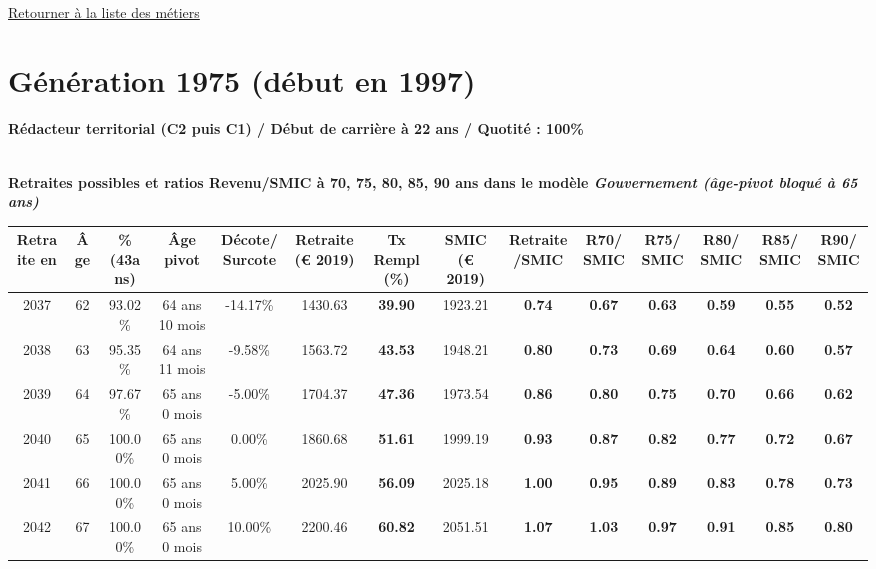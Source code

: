 ~\\ 
 
 \hyperlink{page.2}{\noindent Retourner à la liste des métiers}

 \newpage 

\section{Génération 1975 (début en 1997)\label{Redacteur_100_1975_22_0}} 
 
{\bf \noindent Rédacteur territorial (C2 puis C1) / Début de carrière à 22 ans / Quotité : 100\%}  ~ 

 ~\\{\bf \noindent Retraites possibles et ratios Revenu/SMIC à 70, 75, 80, 85, 90 ans dans le modèle \emph{Gouvernement (âge-pivot bloqué à 65 ans)}}  
 
\begin{adjustbox}{max width=\textwidth} 
\begin{tabular}[htb]{|c|c||c|c|c||c|c||c|c||c|c|c|c|c|} 
\hline 
 Retraite en &  Âge &  \%(43ans) &  Âge pivot &  Décote/Surcote &  Retraite (\euro{} 2019) &  Tx Rempl(\%) &  SMIC (\euro{} 2019) &  Retraite/SMIC &  R70/SMIC &  R75/SMIC &  R80/SMIC &  R85/SMIC &  R90/SMIC \\ 
\hline \hline 
 2037 &  62 &  93.02\% &  64 ans 10 mois &  -14.17\% &  1430.63 &  {\bf 39.90} &  1923.21 &  {\bf {\color{red} 0.74}} &  {\bf {\color{red} 0.67}} &  {\bf {\color{red} 0.63}} &  {\bf {\color{red} 0.59}} &  {\bf {\color{red} 0.55}} &  {\bf {\color{red} 0.52}} \\ 
\hline 
 2038 &  63 &  95.35\% &  64 ans 11 mois &  -9.58\% &  1563.72 &  {\bf 43.53} &  1948.21 &  {\bf {\color{red} 0.80}} &  {\bf {\color{red} 0.73}} &  {\bf {\color{red} 0.69}} &  {\bf {\color{red} 0.64}} &  {\bf {\color{red} 0.60}} &  {\bf {\color{red} 0.57}} \\ 
\hline 
 2039 &  64 &  97.67\% &  65 ans 0 mois &  -5.00\% &  1704.37 &  {\bf 47.36} &  1973.54 &  {\bf {\color{red} 0.86}} &  {\bf {\color{red} 0.80}} &  {\bf {\color{red} 0.75}} &  {\bf {\color{red} 0.70}} &  {\bf {\color{red} 0.66}} &  {\bf {\color{red} 0.62}} \\ 
\hline 
 2040 &  65 &  100.00\% &  65 ans 0 mois &  0.00\% &  1860.68 &  {\bf 51.61} &  1999.19 &  {\bf {\color{red} 0.93}} &  {\bf {\color{red} 0.87}} &  {\bf {\color{red} 0.82}} &  {\bf {\color{red} 0.77}} &  {\bf {\color{red} 0.72}} &  {\bf {\color{red} 0.67}} \\ 
\hline 
 2041 &  66 &  100.00\% &  65 ans 0 mois &  5.00\% &  2025.90 &  {\bf 56.09} &  2025.18 &  {\bf 1.00} &  {\bf {\color{red} 0.95}} &  {\bf {\color{red} 0.89}} &  {\bf {\color{red} 0.83}} &  {\bf {\color{red} 0.78}} &  {\bf {\color{red} 0.73}} \\ 
\hline 
 2042 &  67 &  100.00\% &  65 ans 0 mois &  10.00\% &  2200.46 &  {\bf 60.82} &  2051.51 &  {\bf 1.07} &  {\bf 1.03} &  {\bf {\color{red} 0.97}} &  {\bf {\color{red} 0.91}} &  {\bf {\color{red} 0.85}} &  {\bf {\color{red} 0.80}} \\ 
\hline 
\hline 
\end{tabular} 
\end{adjustbox} 
 
